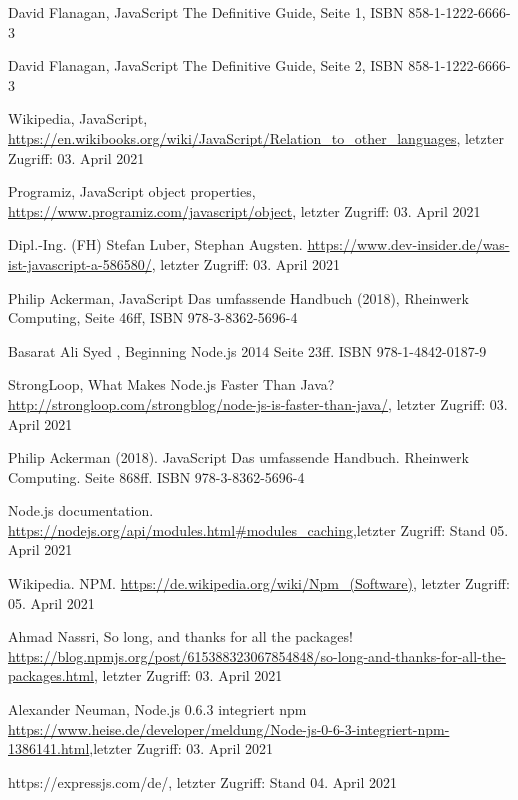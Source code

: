 \documentclass[11pt,a4paper]{article}
\begin{document}
\begin{itemize}
 David Flanagan, JavaScript The Definitive Guide,  Seite 1, ISBN 858-1-1222-6666-3

 David Flanagan, JavaScript The Definitive Guide,  Seite 2, ISBN 858-1-1222-6666-3

 Wikipedia, JavaScript, \url{https://en.wikibooks.org/wiki/JavaScript/Relation_to_other_languages}, letzter Zugriff: 03. April 2021

 Programiz, JavaScript object properties, \url{https://www.programiz.com/javascript/object}, letzter Zugriff: 03. April 2021

 Dipl.-Ing. (FH) Stefan Luber, Stephan Augsten. \url{https://www.dev-insider.de/was-ist-javascript-a-586580/}, letzter Zugriff: 03. April 2021

 Philip Ackerman, JavaScript Das umfassende Handbuch (2018), Rheinwerk Computing, Seite 46ff, ISBN 978-3-8362-5696-4

%
%
%
%



 Basarat Ali Syed , Beginning Node.js 2014 Seite 23ff. ISBN 978-1-4842-0187-9

 StrongLoop, What Makes Node.js Faster Than Java? \url{http://strongloop.com/strongblog/node-js-is-faster-than-java/}, letzter Zugriff: 03. April 2021

 Philip Ackerman (2018). JavaScript Das umfassende Handbuch. Rheinwerk Computing. Seite 868ff. ISBN 978-3-8362-5696-4

 Node.js documentation. \url{https://nodejs.org/api/modules.html#modules_caching},letzter Zugriff: Stand 05. April 2021

 Wikipedia. NPM. \url{https://de.wikipedia.org/wiki/Npm_(Software)}, letzter Zugriff: 05. April 2021

 Ahmad Nassri, So long, and thanks for all the packages! \url{https://blog.npmjs.org/post/615388323067854848/so-long-and-thanks-for-all-the-packages.html}, letzter Zugriff: 03. April 2021

 Alexander Neuman, Node.js 0.6.3 integriert npm
\url{https://www.heise.de/developer/meldung/Node-js-0-6-3-integriert-npm-1386141.html},letzter Zugriff: 03. April 2021

 https://expressjs.com/de/, letzter Zugriff: Stand 04. April 2021


\end{itemize}
\end{document}
